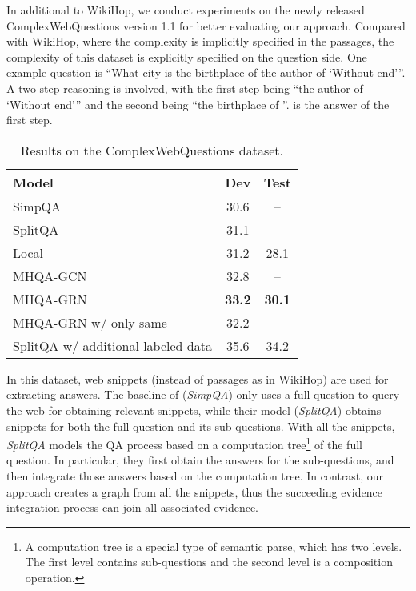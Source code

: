 \documentclass[letterpaper]{article}
\begin{document}
In additional to WikiHop, we conduct experiments on the newly released ComplexWebQuestions version 1.1 \citep{N18-1059} for better evaluating our approach.
Compared with WikiHop, where the complexity is implicitly specified in the passages, the complexity of this dataset is explicitly specified on the question side.
One example question is ``What city is the birthplace of the author of `Without end'''.
A two-step reasoning is involved, with the first step being ``the author of `Without end''' and the second being ``the birthplace of ''. 
 is the answer of the first step.


\begin{table}
\centering
\begin{tabular}{l|c|c}
Model & Dev & Test \\
\hline
SimpQA & 30.6 & -- \\
SplitQA & 31.1 & -- \\
\hline
Local & 31.2 & 28.1 \\
MHQA-GCN & 32.8 & -- \\
MHQA-GRN & \bf 33.2 & \bf 30.1 \\
MHQA-GRN w/ only same & 32.2 & -- \\
\hline
\hline
SplitQA w/ additional labeled data & 35.6 & 34.2 \\
\end{tabular}
\caption{Results on the ComplexWebQuestions dataset.}
\label{tab:compqa}
\end{table}


In this dataset, web snippets (instead of passages as in WikiHop) are used for extracting answers.
The baseline of \citet{N18-1059} (\emph{SimpQA}) only uses a full question to query the web for obtaining relevant snippets, while their model (\emph{SplitQA}) obtains snippets for both the full question and its sub-questions.
With all the snippets, \emph{SplitQA} models the QA process based on a computation tree\footnote{A computation tree is a special type of semantic parse, which has two levels. The first level contains sub-questions and the second level is a composition operation.} of the full question. 
In particular, they first obtain the answers for the sub-questions, and then integrate those answers based on the computation tree.
In contrast, our approach creates a graph from all the snippets, thus the succeeding evidence integration process can join all associated evidence.
\end{document}

